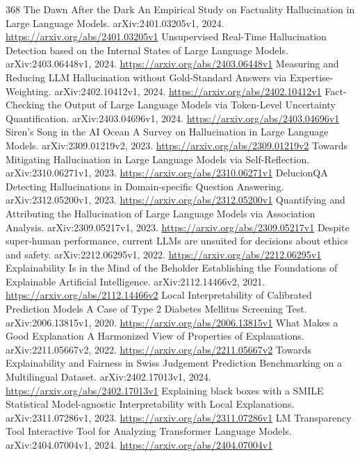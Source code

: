 \documentclass[11pt]{article}
\begin{document}
\begin{thebibliography}{368}
 The Dawn After the Dark An Empirical Study on Factuality Hallucination in Large Language Models. arXiv:2401.03205v1, 2024. \url{https://arxiv.org/abs/2401.03205v1}
 Unsupervised Real-Time Hallucination Detection based on the Internal States of Large Language Models. arXiv:2403.06448v1, 2024. \url{https://arxiv.org/abs/2403.06448v1}
 Measuring and Reducing LLM Hallucination without Gold-Standard Answers via Expertise-Weighting. arXiv:2402.10412v1, 2024. \url{https://arxiv.org/abs/2402.10412v1}
 Fact-Checking the Output of Large Language Models via Token-Level Uncertainty Quantification. arXiv:2403.04696v1, 2024. \url{https://arxiv.org/abs/2403.04696v1}
 Siren's Song in the AI Ocean A Survey on Hallucination in Large Language Models. arXiv:2309.01219v2, 2023. \url{https://arxiv.org/abs/2309.01219v2}
 Towards Mitigating Hallucination in Large Language Models via Self-Reflection. arXiv:2310.06271v1, 2023. \url{https://arxiv.org/abs/2310.06271v1}
 DelucionQA Detecting Hallucinations in Domain-specific Question Answering. arXiv:2312.05200v1, 2023. \url{https://arxiv.org/abs/2312.05200v1}
 Quantifying and Attributing the Hallucination of Large Language Models via Association Analysis. arXiv:2309.05217v1, 2023. \url{https://arxiv.org/abs/2309.05217v1}
 Despite super-human performance, current LLMs are unsuited for decisions about ethics and safety. arXiv:2212.06295v1, 2022. \url{https://arxiv.org/abs/2212.06295v1}
 Explainability Is in the Mind of the Beholder Establishing the Foundations of Explainable Artificial Intelligence. arXiv:2112.14466v2, 2021. \url{https://arxiv.org/abs/2112.14466v2}
 Local Interpretability of Calibrated Prediction Models A Case of Type 2 Diabetes Mellitus Screening Test. arXiv:2006.13815v1, 2020. \url{https://arxiv.org/abs/2006.13815v1}
 What Makes a Good Explanation A Harmonized View of Properties of Explanations. arXiv:2211.05667v2, 2022. \url{https://arxiv.org/abs/2211.05667v2}
 Towards Explainability and Fairness in Swiss Judgement Prediction Benchmarking on a Multilingual Dataset. arXiv:2402.17013v1, 2024. \url{https://arxiv.org/abs/2402.17013v1}
 Explaining black boxes with a SMILE Statistical Model-agnostic Interpretability with Local Explanations. arXiv:2311.07286v1, 2023. \url{https://arxiv.org/abs/2311.07286v1}
 LM Transparency Tool Interactive Tool for Analyzing Transformer Language Models. arXiv:2404.07004v1, 2024. \url{https://arxiv.org/abs/2404.07004v1}

\end{thebibliography}
\end{document}
